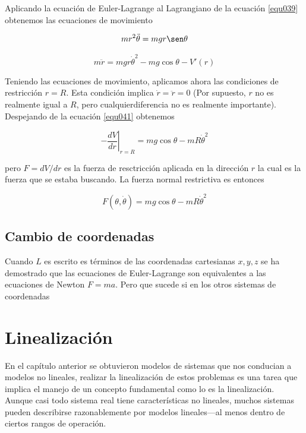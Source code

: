 \documentclass[12pt]{book}
\theoremstyle{definition}
\theoremstyle{remark}
\theoremstyle{plain}
\begin{document}
Aplicando la ecuación de Euler-Lagrange al Lagrangiano de la ecuación \ref{equ039} obtenemos las ecuaciones de movimiento

\begin{equation}
\label{equ040}
m r^2 \ddot{\theta} = m g r \sen \theta
\end{equation}

\begin{equation}
\label{equ041}
m \ddot{r} = m g r \dot{\theta}^2-m g \cos \theta - V'(r)
\end{equation}

Teniendo las ecuaciones de movimiento, aplicamos ahora las condiciones de restricción $r=R$. Esta condición implica $\dot{r}= \ddot{r}=0$  (Por supuesto, $r$ no es realmente igual a $R$, pero cualquierdiferencia no es realmente importante). Despejando de la ecuación \ref{equ041} obtenemos

\begin{equation}
\label{equ042}
\left . - \frac{d V}{d r}  \right | _{r=R} = m g \cos \theta - m R \dot{\theta}^2
\end{equation}

pero $ F = dV / d r$ es la fuerza de resctricción aplicada en la dirección $r$ la cual es la fuerza que se estaba buscando. La fuerza normal restrictiva es entonces

\begin{equation}
\label{equ043}
F (\theta, \dot{\theta} )= m g \cos \theta - m R \dot{\theta}^2
\end{equation}

\section{Cambio de coordenadas}

Cuando $L$ es escrito es términos de las coordenadas cartesianas $x,y,z$  se ha demostrado que las ecuaciones de Euler-Lagrange son equivalentes a las ecuaciones de Newton $F=m a$. Pero que sucede si en los otros sistemas de coordenadas



\chapter{Linealización}

En el capítulo anterior se obtuvieron modelos de sistemas que nos conducian a modelos no lineales, realizar la linealización de estos problemas es una tarea que implica el manejo de un concepto fundamental como lo es la linealización. Aunque casi todo sistema real tiene características no lineales, muchos sistemas pueden describirse razonablemente por modelos lineales—al menos dentro de ciertos rangos de operación.
\end{document}

